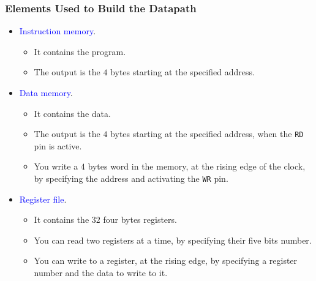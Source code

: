 \documentclass{beamer}
\begin{document}
\begin{frame}%
\frametitle{Elements Used to Build the Datapath}

\begin{itemize}

\item \textcolor{blue}{Instruction memory}.
  \begin{itemize}
  \item It contains the program.
  \item The output is the $4$ bytes starting at the specified address.
  \end{itemize}
  \vspace{0.2cm}

\item \textcolor{blue}{Data memory}.
  \begin{itemize}
  \item It contains the data.
  \item The output is the $4$ bytes starting at the specified address, when the \texttt{RD} pin is active.
  \item You write a $4$ bytes word in the memory, at the rising edge of the clock, by specifying the address and activating the
    \texttt{WR} pin.
  \end{itemize}
  \vspace{0.2cm}

\item \textcolor{blue}{Register file}.
  \begin{itemize}
  \item It contains the $32$ four bytes registers.
  \item You can read two registers at a time, by specifying their five bits number.
  \item You can write to a register, at the rising edge, by specifying a register number and the data to write to it.
  \end{itemize}

\end{itemize}

\end{frame}
\end{document}
